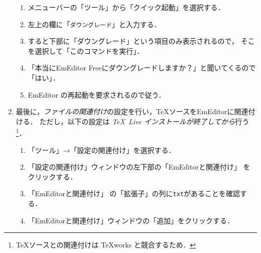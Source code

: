 \documentclass{ltjsarticle}
\begin{document}
\begin{enumerate}
  \begin{enumerate}
  \item %
    メニューバーの「ツール」から「クイック起動」を選択する．
  \item 左上の欄に「\texttt{ダウングレード}」と入力する．
  \item すると下部に「ダウングレード」という項目のみ表示されるので，
    そこを選択して「このコマンドを実行」．
  \item 「本当にEmEditor Freeにダウングレードしますか？」と聞いてくるので「はい」．
  \item EmEditor の再起動を要求されるので従う．
  \end{enumerate}

\item 最後に，\emph{ファイルの関連付け}の設定を行い，\TeX ソースをEmEditorに関連付ける．
  ただし，以下の設定は \emph{\TeX~Live インストールが終了してから}行う\footnote{\TeX ソースとの関連付けは \TeX works と競合するため．}．
  \begin{enumerate}
  \item 「ツール」→「設定の関連付け」を選択する．%


  \item 「設定の関連付け」ウィンドウの左下部の「EmEditorと関連付け」
    をクリックする．%

  \item 「EmEditorと関連付け」%
    の「拡張子」の列に\texttt{txt}があることを確認する．

  \item 「EmEditorと関連付け」ウィンドウの「追加」をクリックする．


\end{enumerate}
\end{enumerate}
\end{document}
